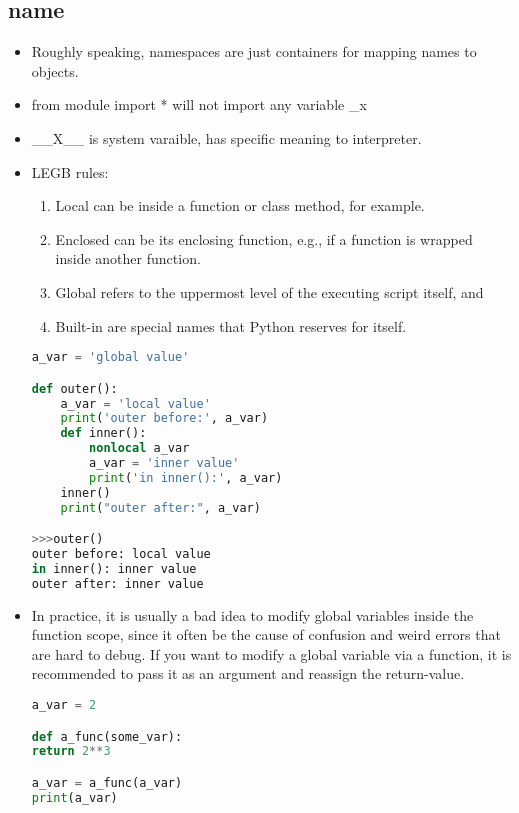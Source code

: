 \documentclass[a4paper,12pt,twoside]{book}
\begin{document}
\subsection{name}
\begin{itemize}
	\item Roughly speaking, namespaces are just containers for mapping names to objects. 
	\item from module import * will not import  any variable \_x

	\item \_\_X\_\_ is system varaible, has specific meaning to interpreter. 

	\item LEGB rules:
	\begin{enumerate}
		\item 	Local can be inside a function or class method, for example.
		\item Enclosed can be its enclosing function, e.g., if a function is wrapped inside another function.
		\item Global refers to the uppermost level of the executing script itself, and
		\item Built-in are special names that Python reserves for itself.
	\end{enumerate}

\begin{lstlisting}[frame=single, language=Python]
a_var = 'global value'

def outer():
	a_var = 'local value'
	print('outer before:', a_var)
	def inner():
		nonlocal a_var
		a_var = 'inner value'
		print('in inner():', a_var)
	inner()
	print("outer after:", a_var)

>>>outer()
outer before: local value
in inner(): inner value
outer after: inner value
	\end{lstlisting}  
	\item In practice, it is usually a bad idea to modify global variables inside the function scope, since it often be the cause of confusion and weird errors that are hard to debug.
	If you want to modify a global variable via a function, it is recommended to pass it as an argument and reassign the return-value.
\begin{lstlisting}[frame=single, language=Python]
a_var = 2

def a_func(some_var):
return 2**3

a_var = a_func(a_var)
print(a_var)
\end{lstlisting} 
	

\end{itemize}
\end{document}
